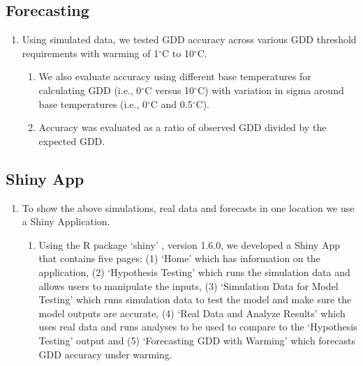 \documentclass{article}\usepackage[]{graphicx}\usepackage[]{color}
\begin{document}
\subsection*{Forecasting}
\begin{enumerate}
\item Using simulated data, we tested GDD accuracy across various GDD threshold requirements with warming of 1$^{\circ}$C to 10$^{\circ}$C. 
  \begin{enumerate}
  \item We also evaluate accuracy using different base temperatures for calculating GDD (i.e., 0$^{\circ}$C versus 10$^{\circ}$C) with variation in sigma around base temperatures (i.e., 0$^{\circ}$C and 0.5$^{\circ}$C).
  \item Accuracy was evaluated as a ratio of observed GDD divided by the expected GDD.
  \end{enumerate}
\end{enumerate}

\subsection*{Shiny App}
\begin{enumerate}
\item To show the above simulations, real data and forecasts in one location we use a Shiny Application. 
  \begin{enumerate}
  \item Using the R package `shiny' \citep{shiny2021}, version 1.6.0, we developed a Shiny App that contains five pages: (1) `Home' which has information on the application, (2) `Hypothesis Testing' which runs the simulation data and allows users to manipulate the inputs, (3) `Simulation Data for Model Testing' which runs simulation data to test the model and make sure the model outputs are accurate, (4) `Real Data and Analyze Results' which uses real data and runs analyses to be used to compare to the `Hypothesis Testing' output and (5) `Forecasting GDD with Warming' which forecasts GDD accuracy under warming. 
  \end{enumerate}
\end{enumerate}
\end{document}
